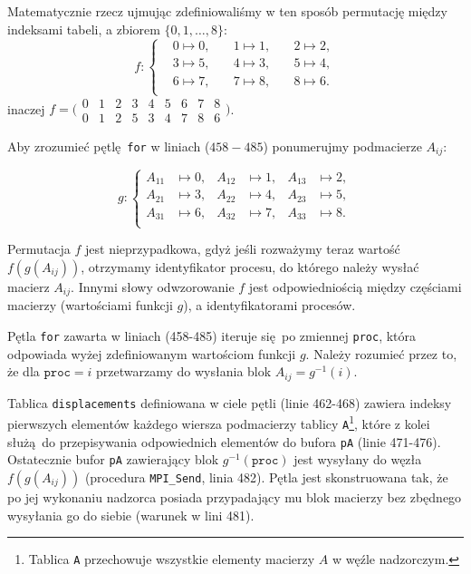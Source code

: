 Matematycznie rzecz ujmując zdefiniowaliśmy w ten sposób permutację między indeksami tabeli, a zbiorem \(\{0, 1, \dots, 8\}\):
\begin{equation*}
f\colon \left\{\begin{aligned}
& 0\mapsto 0, & \quad 1\mapsto 1, & \quad 2\mapsto 2, \\
& 3\mapsto 5, & \quad 4\mapsto 3, & \quad 5\mapsto 4, \\
& 6\mapsto 7, & \quad 7\mapsto 8, & \quad 8\mapsto 6. \\
\end{aligned}\right.
\end{equation*}
inaczej \(f=\bigl(\begin{smallmatrix}
  0 & 1 & 2 & 3 & 4 & 5 & 6 & 7 & 8\\
  0 & 1 & 2 & 5 & 3 & 4 & 7 & 8 & 6
\end{smallmatrix}\bigr)\).

\noindent Aby zrozumieć pętlę \texttt{for} w liniach (\(458-485\)) 
ponumerujmy podmacierze \(A_{ij}\):

\begin{equation*}
g\colon \left\{\begin{aligned}
A_{11}&\mapsto 0, & A_{12}&\mapsto 1, & A_{13}&\mapsto 2, \\
A_{21}&\mapsto 3, & A_{22}&\mapsto 4, & A_{23}&\mapsto 5, \\
A_{31}&\mapsto 6, & A_{32}&\mapsto 7, & A_{33}&\mapsto 8. \\
\end{aligned}\right.
\end{equation*}


Permutacja \(f\) jest nieprzypadkowa, gdyż jeśli rozważymy teraz wartość \(f\left(g(A_{ij})\right)\), otrzymamy identyfikator procesu, do którego należy wysłać macierz \(A_{ij}\). Innymi słowy odwzorowanie \(f\) jest odpowiedniością między częściami macierzy (wartościami funkcji \(g\)), a identyfikatorami procesów.

Pętla \texttt{for} zawarta w liniach (458-485) iteruje się po zmiennej \texttt{proc}, która odpowiada wyżej zdefiniowanym wartościom funkcji \(g\). Należy rozumieć przez to, że dla \(\mathtt{proc}=i\) przetwarzamy do wysłania blok \(A_{ij}=g^{-1}(i)\).


Tablica \texttt{displacements} definiowana w ciele pętli (linie 462-468) zawiera indeksy pierwszych elementów każdego wiersza podmacierzy tablicy \texttt{A}\footnote{Tablica \texttt{A} przechowuje wszystkie elementy macierzy \(A\) w węźle nadzorczym.}, które z kolei służą do przepisywania odpowiednich elementów do bufora \texttt{pA} (linie 471-476). Ostatecznie bufor \texttt{pA} zawierający blok \(g^{-1}(\mathtt{proc})\) jest wysyłany do węzła \(f(g(A_{ij}))\) (procedura \texttt{MPI\_Send}, linia 482). Pętla jest skonstruowana tak, że po jej wykonaniu nadzorca posiada przypadający mu blok macierzy bez zbędnego wysyłania go do siebie (warunek w lini 481). 


